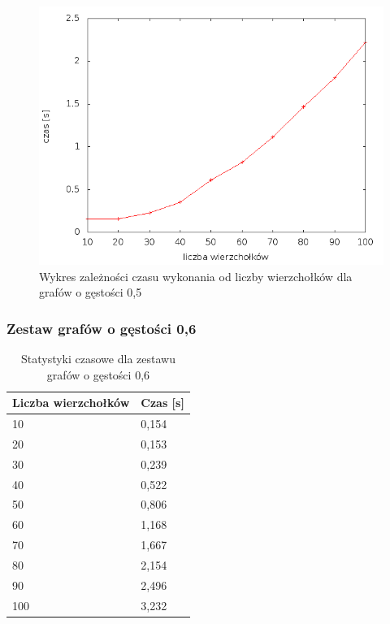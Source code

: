 \documentclass[12pt, a4paper]{article}
\begin{document}
\begin{figure}[h]
    \begin{center}
	\includegraphics[scale=0.5]{results/img/den/den_05.png}
	\caption{Wykres zależności czasu wykonania od liczby wierzchołków dla grafów o gęstości 0,5}
    \end{center}
\end{figure}

\subsubsection*{Zestaw grafów o gęstości 0,6}
\begin{table}[H]
\caption{Statystyki czasowe dla zestawu grafów o gęstości 0,6}
\begin{center}
    \begin{tabular}{|l|l|}
    \hline
    Liczba wierzchołków & Czas [s] \\ \hline
    10 & 0,154 \\ \hline
    20 & 0,153 \\ \hline
    30 & 0,239 \\ \hline
    40 & 0,522 \\ \hline
    50 & 0,806 \\ \hline
    60 & 1,168 \\ \hline
    70 & 1,667 \\ \hline
    80 & 2,154 \\ \hline
    90 & 2,496 \\ \hline
    100 & 3,232 \\ \hline
    \end{tabular}
\end{center}
\end{table}
\end{document}

